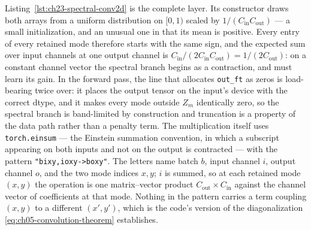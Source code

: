 Listing~\ref{lst:ch23-spectral-conv2d} is the complete layer. Its constructor
draws both arrays from a uniform distribution on $[0,1)$ scaled by
$1/(C_{\text{in}}C_{\text{out}})$ --- a small initialization, and an unusual one
in that its mean is positive. Every entry of every retained
mode therefore starts with the same sign, and the expected sum over input
channels at one output channel is
$C_{\text{in}}/(2C_{\text{in}}C_{\text{out}}) = 1/(2C_{\text{out}})$: on a
constant channel vector the spectral branch begins as a contraction, and must
learn its gain. In the forward pass, the line that
allocates
\texttt{out\_ft} as zeros is load-bearing twice over: it places the output
tensor on the input's device with the correct dtype, and it makes every mode
outside $Z_m$ identically zero, so the spectral branch is band-limited by
construction and truncation is a property of the data path rather than a penalty
term. The multiplication itself uses \texttt{torch.einsum} --- the Einstein
summation convention, in which a subscript appearing on both inputs and not on
the output is contracted --- with the pattern \texttt{"bixy,ioxy->boxy"}. The
letters name batch $b$, input channel $i$, output channel $o$, and the two mode
indices $x, y$; $i$ is summed, so at each retained mode $(x, y)$ the operation
is one matrix--vector product $C_{\text{out}} \times C_{\text{in}}$ against the
channel vector of coefficients at that mode. Nothing in the pattern carries a
term coupling $(x,y)$ to a different $(x',y')$, which is the code's version of
the diagonalization \eqref{eq:ch05-convolution-theorem} establishes.

